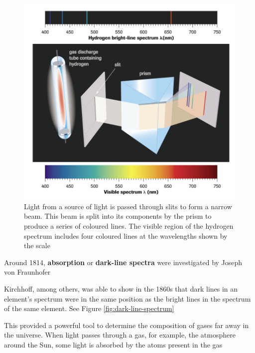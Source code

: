 \begin{figure}[ht!]
    \centering
    \includegraphics[width=0.9 \textwidth]{../figures/spectroscope.png}
    \caption{Light from a source of light is passed through slits to form a narrow beam. This beam
            is split into its components by the prism to produce a series of coloured lines. The visible region
            of the hydrogen spectrum includes four coloured lines at the wavelengths shown by the scale}
    \label{fig:spectroscope}
\end{figure}

\begin{bulleted-list}
    \item Around 1814, \textbf{absorption} or \textbf{dark-line spectra} were investigated by
        Joseph von Fraunhofer
    \item Kirchhoff, among others, was able to show in the 1860s that dark lines in an element's
        spectrum were in the same position as the bright lines in the spectrum of the same element.
        See Figure \ref{fig:dark-line-spectrum}
    \item This provided a powerful tool to determine the composition of gases far away in the
        universe. When light passes through a gas, for example, the atmosphere around the Sun,
        some light is absorbed by the atoms present in the gas
\end{bulleted-list}

